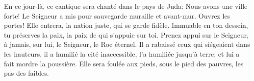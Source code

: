 En ce jour-là, ce cantique sera chanté dans le pays de Juda:
	Nous avons une ville forte!
	Le Seigneur a mis pour sauvegarde muraille et avant-mur.
Ouvrez les portes!
	Elle entrera, la nation juste, qui se garde fidèle.
Immuable en ton dessein, tu préserves la paix, la paix de qui s’appuie sur toi.
	Prenez appui sur le Seigneur, à jamais, sur lui, le Seigneur, le Roc éternel.
Il a rabaissé ceux qui siégeaient dans les hauteurs, il a humilié la cité inaccessible,
	l’a humiliée jusqu’à terre, et lui a fait mordre la poussière.
Elle sera foulée aux pieds,
	sous le pied des pauvres, les pas des faibles.
